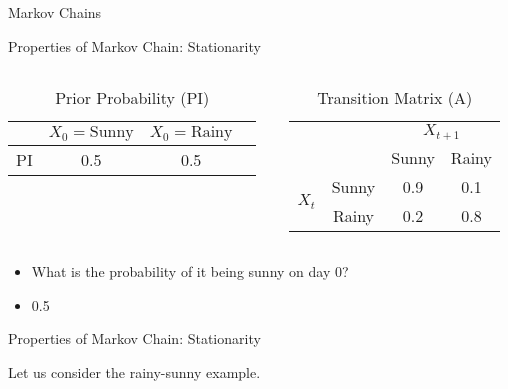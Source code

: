 \documentclass{beamer}
\begin{document}
\begin{section}{Markov Chains}
\begin{frame}{Properties of Markov Chain: Stationarity}
        \begin{columns}[T] %
          \begin{column}{0.48\textwidth} %
            \begin{table}[h]
              \centering
              \caption{Prior Probability (PI)}
              \begin{tabular}{cccc}
                \toprule
                & \(X_0 = \text{Sunny}\) & \(X_0 = \text{Rainy}\) \\
                \midrule
                PI & 0.5 & 0.5 \\
                \bottomrule
              \end{tabular}
            \end{table}
          \end{column}
          \begin{column}{0.48\textwidth} %
            \begin{table}[h]
              \centering
              \caption{Transition Matrix (A)}
              \begin{tabular}{cccc}
                \toprule
                & & \multicolumn{2}{c}{\(X_{t+1}\)} \\
                \cmidrule{3-4}
                & & Sunny & Rainy \\
                \midrule
                \multirow{2}{*}{\(X_t\)} & Sunny & 0.9 & 0.1 \\
                & Rainy & 0.2 & 0.8 \\
                \bottomrule
              \end{tabular}
            \end{table}
          \end{column}
        \end{columns}

        \begin{itemize}
            \item What is the probability of it being sunny on day 0?
            \pause \item 0.5

        \end{itemize}
      \end{frame}


      \begin{frame}{Properties of Markov Chain: Stationarity}

        Let us consider the rainy-sunny example.
      

\end{frame}
\end{section}
\end{document}
